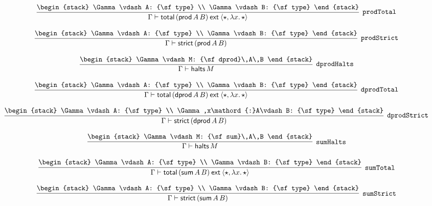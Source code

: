 \[
\infer[{\tt prodTotal}]{\Gamma \vdash {\sf total}\,({\sf prod}\,A\,B)\:{\sf ext}\:\langle \star ,\lambda x.\,\star \rangle }{
\begin{stack}
\Gamma \vdash A: {\sf type}
\\
\Gamma \vdash B: {\sf type}
\end{stack}}
\]

\[
\infer[{\tt prodStrict}]{\Gamma \vdash {\sf strict}\,({\sf prod}\,A\,B)}{
\begin{stack}
\Gamma \vdash A: {\sf type}
\\
\Gamma \vdash B: {\sf type}
\end{stack}}
\]

\[
\infer[{\tt dprodHalts}]{\Gamma \vdash {\sf halts}\,M}{
\begin{stack}
\Gamma \vdash M: {\sf dprod}\,A\,B
\end{stack}}
\]

\[
\infer[{\tt dprodTotal}]{\Gamma \vdash {\sf total}\,({\sf dprod}\,A\,B)\:{\sf ext}\:\langle \star ,\lambda x.\,\star \rangle }{
\begin{stack}
\Gamma \vdash A: {\sf type}
\\
\Gamma \vdash B: {\sf type}
\end{stack}}
\]

\[
\infer[{\tt dprodStrict}]{\Gamma \vdash {\sf strict}\,({\sf dprod}\,A\,B)}{
\begin{stack}
\Gamma \vdash A: {\sf type}
\\
\Gamma ,x\mathord{:}A\vdash B: {\sf type}
\end{stack}}
\]

\[
\infer[{\tt sumHalts}]{\Gamma \vdash {\sf halts}\,M}{
\begin{stack}
\Gamma \vdash M: {\sf sum}\,A\,B
\end{stack}}
\]

\[
\infer[{\tt sumTotal}]{\Gamma \vdash {\sf total}\,({\sf sum}\,A\,B)\:{\sf ext}\:\langle \star ,\lambda x.\,\star \rangle }{
\begin{stack}
\Gamma \vdash A: {\sf type}
\\
\Gamma \vdash B: {\sf type}
\end{stack}}
\]

\[
\infer[{\tt sumStrict}]{\Gamma \vdash {\sf strict}\,({\sf sum}\,A\,B)}{
\begin{stack}
\Gamma \vdash A: {\sf type}
\\
\Gamma \vdash B: {\sf type}
\end{stack}}
\]

